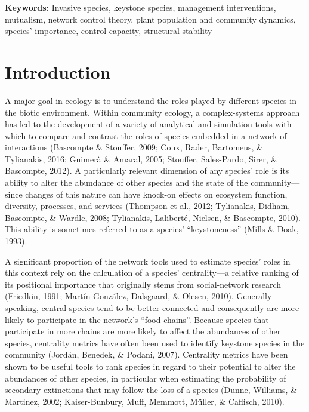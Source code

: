 \documentclass[a4paper]{artikel1}
\theoremstyle{definition}
\theoremstyle{definition}
\theoremstyle{definition}
\theoremstyle{remark}
\begin{document}
\textbf{Keywords:} Invasive species, keystone species, management
interventions, mutualism, network control theory, plant population and
community dynamics, species' importance, control capacity, structural
stability

\clearpage

\section{Introduction}\label{introduction}

A major goal in ecology is to understand the roles played by different
species in the biotic environment. Within community ecology, a
complex-systems approach has led to the development of a variety of
analytical and simulation tools with which to compare and contrast the
roles of species embedded in a network of interactions (Bascompte \&
Stouffer, 2009; Coux, Rader, Bartomeus, \& Tylianakis, 2016; Guimerà \&
Amaral, 2005; Stouffer, Sales-Pardo, Sirer, \& Bascompte, 2012). A
particularly relevant dimension of any species' role is its ability to
alter the abundance of other species and the state of the
community---since changes of this nature can have knock-on effects on
ecosystem function, diversity, processes, and services (Thompson et al.,
2012; Tylianakis, Didham, Bascompte, \& Wardle, 2008; Tylianakis,
Laliberté, Nielsen, \& Bascompte, 2010). This ability is sometimes
referred to as a species' ``keystoneness'' (Mills \& Doak, 1993).

A significant proportion of the network tools used to estimate species'
roles in this context rely on the calculation of a species'
centrality---a relative ranking of its positional importance that
originally stems from social-network research (Friedkin, 1991; Martín
González, Dalsgaard, \& Olesen, 2010). Generally speaking, central
species tend to be better connected and consequently are more likely to
participate in the network's ``food chains''. Because species that
participate in more chains are more likely to affect the abundances of
other species, centrality metrics have often been used to identify
keystone species in the community (Jordán, Benedek, \& Podani, 2007).
Centrality metrics have been shown to be useful tools to rank species in
regard to their potential to alter the abundances of other species, in
particular when estimating the probability of secondary extinctions that
may follow the loss of a species (Dunne, Williams, \& Martinez, 2002;
Kaiser-Bunbury, Muff, Memmott, Müller, \& Caflisch, 2010).
\end{document}
